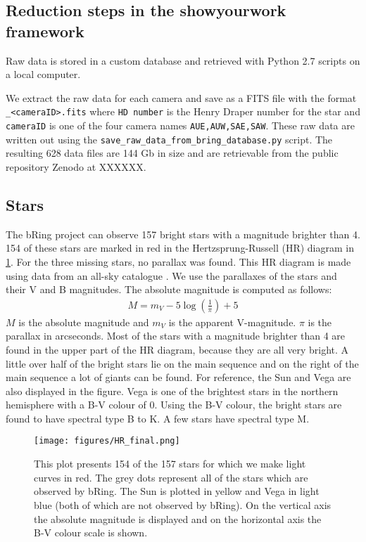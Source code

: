 \documentclass[onecolumn]{aa} %
\begin{document}
\subsection{Reduction steps in the showyourwork framework}

Raw data is stored in a custom database and retrieved with Python 2.7 scripts on a local computer.

We extract the raw data for each camera and save as a FITS file with the format {\tt <HD number>\_<cameraID>.fits} where {\tt HD number} is the Henry Draper number for the star and {\tt cameraID} is one of the four camera names {\tt AUE,AUW,SAE,SAW}.
%
These raw data are written out using the {\tt save\_raw\_data\_from\_bring\_database.py} script.
%
The resulting 628 data files are 144 Gb in size and are retrievable from the public repository Zenodo at XXXXXX.


\subsection{Stars}
The bRing project can observe 157 bright stars with a magnitude brighter than 4.
%
154 of these stars are marked in red in the Hertzsprung-Russell (HR) diagram in \ref{HRD}. For the three missing stars, no parallax was found.
%
This HR diagram is made using data from an all-sky catalogue \citep{Kharchenko_2001}.
%
We use the parallaxes of the stars and their V and B magnitudes. The absolute magnitude is computed as follows:
\begin{align}
    M = m_V -5\log\left(\frac{1}{\pi}\right) + 5
\end{align}
$M$ is the absolute magnitude and $m_V$ is the apparent V-magnitude. $\pi$ is the parallax in arcseconds.
%
Most of the stars with a magnitude brighter than 4 are found in the upper part of the HR diagram, because they are all very bright.
%
A little over half of the bright stars lie on the main sequence and on the right of the main sequence a lot of giants can be found.
%
For reference, the Sun and Vega are also displayed in the figure.
%
Vega is one of the brightest stars in the northern hemisphere with a B-V colour of 0.
%
Using the B-V colour, the bright stars are found to have spectral type B to K.
%
A few stars have spectral type M. 
\begin{figure}
    \centering
    \texttt{[image: figures/HR\_final.png]}
    \caption{This plot presents 154 of the 157 stars for which we make light curves in red.
      The grey dots represent all of the stars which are observed by bRing.
      The Sun is plotted in yellow and Vega in light blue (both of which are not observed by bRing).
      On the vertical axis the absolute magnitude is displayed and on the horizontal axis the B-V colour scale is shown.}
    \label{HRD}
  \end{figure}
\end{document}
